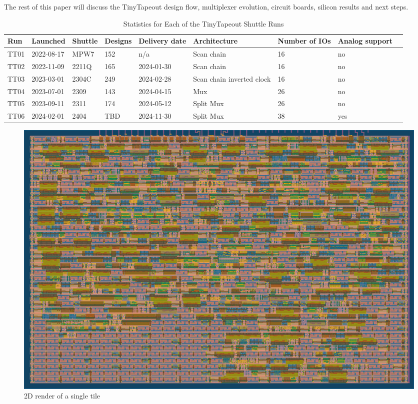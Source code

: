 The rest of this paper will discuss the TinyTapeout design flow, multiplexer evolution, circuit boards, silicon results and next steps.

\begin{table}[!t]
\centering
\caption{Statistics for Each of the TinyTapeout Shuttle Runs}
\label{tab:tinytapeout}
\begin{tabularx}{\textwidth}{@{}l *{8}{X}@{}}
\toprule
\textbf{Run} & \textbf{Launched} & \textbf{Shuttle} & \textbf{Designs} & \textbf{Delivery date} & \textbf{Architecture} & \textbf{Number of IOs} & \textbf{Analog support} \\
\midrule
TT01 & 2022-08-17  & MPW7  & 152 & n/a        & Scan chain                & 16 & no  \\
TT02 & 2022-11-09  & 2211Q & 165 & 2024-01-30 & Scan chain                & 16 & no  \\
TT03 & 2023-03-01  & 2304C & 249 & 2024-02-28 & Scan chain inverted clock & 16 & no  \\
TT04 & 2023-07-01  & 2309  & 143 & 2024-04-15 & Mux                       & 26 & no  \\
TT05 & 2023-09-11  & 2311  & 174 & 2024-05-12 & Split Mux                 & 26 & no  \\
TT06 & 2024-02-01  & 2404  & TBD & 2024-11-30 & Split Mux                 & 38 & yes \\
\bottomrule
\end{tabularx}
\end{table}

\begin{figure}[!t]
\centering
\includegraphics[width=\columnwidth]{./Figs/gh action gds layout.png}
\caption{2D render of a single tile}
\label{fig:render_cells_in_use}
\end{figure}


